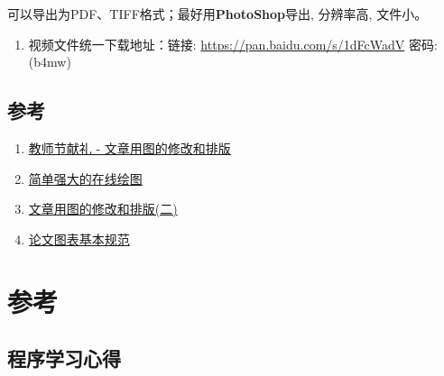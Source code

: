 \documentclass[]{article}
\providecommand{\tightlist}{%
  \setlength{\itemsep}{0pt}\setlength{\parskip}{0pt}}
\numberwithin{figure}{section}
\numberwithin{table}{section}
\theoremstyle{definition}
\theoremstyle{definition}
\theoremstyle{definition}
\theoremstyle{remark}
\begin{document}
可以导出为PDF、TIFF格式；最好用\textbf{PhotoShop}导出, 分辨率高,
文件小。

\begin{enumerate}
\def\labelenumi{\arabic{enumi}.}
\setcounter{enumi}{5}
\tightlist
\item
  视频文件统一下载地址：链接: \url{https://pan.baidu.com/s/1dFcWadV}
  密码: (b4mw)
\end{enumerate}

\subsection{参考}\label{-2}

\begin{enumerate}
\def\labelenumi{\arabic{enumi}.}
\tightlist
\item
  \href{https://mp.weixin.qq.com/s/IJNyhinakY0lSXgCN7b9ug}{教师节献礼 -
  文章用图的修改和排版}
\item
  \href{http://mp.weixin.qq.com/s?__biz=MzI5MTcwNjA4NQ==\&mid=2247484624\&idx=1\&sn=7f97f3cd03d6891f71ac3bb778ad84bb\&chksm=ec0dc15adb7a484c0c1a3cfe25892c22d3ffc21276d7ac8ed5794f020b99003a86b3c6d5bc31\#rd}{简单强大的在线绘图}
\item
  \href{http://mp.weixin.qq.com/s/HTsufk71U3wf14OOWSKEeQ}{文章用图的修改和排版(二)}
\item
  \href{http://mp.weixin.qq.com/s/SCT4oso_vI0UNIJZTaG95g}{论文图表基本规范}
\end{enumerate}

\section{参考}\label{ref}

\subsection{程序学习心得}
\end{document}
